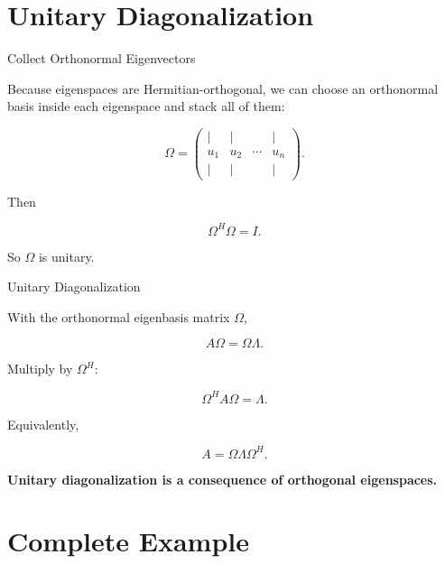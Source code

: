 \documentclass[10pt]{beamer}
\theoremstyle{definition}
\newcommand{\x}[1]{\alert{\textbf{#1}}}
\begin{document}
\section{Unitary Diagonalization}

\begin{frame}{Collect Orthonormal Eigenvectors}

Because eigenspaces are Hermitian-orthogonal, we can choose an orthonormal basis inside each eigenspace and stack all of them:

$$
\Omega=\begin{pmatrix}|&|&&|\\
u_1&u_2&\cdots&u_n\\
|&|&&|
\end{pmatrix}.
$$

\vfill

Then

$$
\Omega^H\Omega=I.
$$

\vfill

So $\Omega$ is unitary.

\end{frame}

\begin{frame}{Unitary Diagonalization}

With the orthonormal eigenbasis matrix $\Omega$,

$$
A\Omega=\Omega\Lambda.
$$

\vfill

Multiply by $\Omega^H$:

$$
\boxed{\Omega^HA\Omega=\Lambda.}
$$

\vfill

Equivalently,

$$
\boxed{A=\Omega\Lambda\Omega^H.}
$$

\vfill

\begin{center}
\x{Unitary diagonalization is a consequence of orthogonal eigenspaces.}
\end{center}

\end{frame}


\section{Complete Example}
\end{document}
